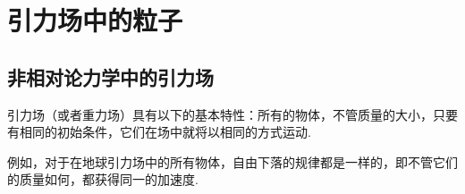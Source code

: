 \chapter{引力场中的粒子}

\section{非相对论力学中的引力场}

引力场（或者重力场）具有以下的基本特性：所有的物体，不管质量的大小，只要有相同的初始条件，它们在场中就将以相同的方式运动.

例如，对于在地球引力场中的所有物体，自由下落的规律都是一样的，即不管它们的质量如何，都获得同一的加速度.

